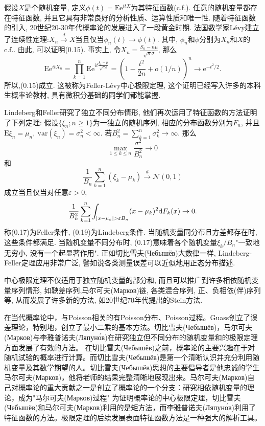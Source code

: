 假设$X$是个随机变量, 定义$\phi(t) = \mathrm{E}\mathrm{e}^{itX}$为其特征函数(c.f.). 任意的随机变量都存在特征函数, 并且它具有非常良好的分析性质、运算性质和唯一性. 随着特征函数的引入, 20世纪20-30年代概率论的发展进入了一段黄金时期. 法国数学家Lévy建立了连续性定理:$X_n\stackrel{d}{\rightarrow}X$当且仅当$\phi_n(t)\to\phi(t)$. 其中, $\phi_n$和$\phi$分别为$X_n$和$X$的c.f.. 由此, 可以证明(0.15). 事实上, 令$X_n = \frac{S_n-n\mu}{\sqrt{n}\sigma}$, 那么
\begin{equation}
        \mathrm{E}\mathrm{e}^{itX_n} =\prod_{k=1}^n\mathrm{E}\mathrm{e}^{it\frac{\xi_k-\mu}{\sqrt{n}\sigma}}
        =\left( 1-\frac{t^2}{2n}+o(1/n) \right)^n
        \to \mathrm{e}^{-t^2/2}.
\end{equation}
所以,(0.15)成立. 这被称为Feller-Lévy中心极限定理, 这个证明已经写入许多的本科生概率论教材, 具有微积分基础的同学们都能掌握.

Lindeberg和Feller研究了独立不同分布情形, 他们再次运用了特征函数的方法证明了下列定理: 假设$\{\xi_n;n\geqslant 1\}$为一独立的随机序列, 相应的分布函数分别为$F_n$, 并且$\mathrm{E}\xi_n = \mu_n,~\mathrm{var}(\xi_n) = \sigma^2_n<\infty$. 若$B_n^2 = \sum_{k=1}^{n}\sigma_k^2\to\infty$. 那么
\begin{equation}
    \max_{1\leqslant k\leqslant n} \frac{\sigma^2}{B_n^2}\to 0
\end{equation}
和\begin{equation}
    \frac{1}{B_n}\sum_{k=1}^n(\xi_k-\mu_k)\stackrel{d}{\rightarrow}\mathcal{N}(0,1)
\end{equation}
成立当且仅当对任意$\varepsilon>0$,
\begin{equation}
    \frac{1}{B_n^2}\sum_{k=1}^n\int_{\lvert x-\mu_k\rvert>\varepsilon B_n}(x-\mu_k)^2\mathrm{d}F_k(x)\to 0.
\end{equation}
称(0.17)为Feller条件, (0.19)为Lindeberg条件.  当随机变量同分布且方差都存在时, 这些条件都满足. 当随机变量不同分布时, (0.17)意味着各个随机变量$\xi_k/B_n$"一致地无穷小, 没有一个起显著作用". 正如切比雪夫(Чебышёв)大数律一样, Lindeberg-Feller定理应用非常广泛, 譬如说各类测量误差可以近似地用正态分布描述.

中心极限定理不仅适用于独立随机变量的部分和, 而且可以推广到许多相依随机变量序列情形, 如鞅差序列,马尔可夫(Марков)链, 各类混合序列, 正、负相依(伴)序列等, 从而发展了许多新的方法, 如20世纪70年代提出的Stein方法.



在当代概率论中，与Poisson相关的有Poisson分布、Poisson过程。Guass创立了误差理论，特别地，创立了最小二乘的基本方法。切比雪夫(Чебышёв)，马尔可夫(Марков)与李雅普诺夫(Ляпуно́в)在研究独立但不同分布的随机变量和的极限定理方面发展了有效的方法。
在切比雪夫(Чебышёв)之前，概率论的主要兴趣在于对随机试验的概率进行计算。而切比雪夫(Чебышёв)是第一个清晰认识并充分利用随机变量及其数学期望的人。切比雪夫(Чебышёв)思想的主要倡导者是他忠诚的学生马尔可夫(Марков)，他将老师的结果完整清晰地展现出来。马尔可夫(Марков)自己对概率论的重大贡献之一是创立了概率论的一个分支：研究相依随机变量的理论，成为"马尔可夫(Марков)过程"
为证明概率论的中心极限定理，切比雪夫(Чебышёв)和马尔可夫(Марков)利用的是矩方法，而李雅普诺夫(Ляпуно́в)利用了特征函数的方法。极限定理的后续发展表面特征函数方法是一种强大的解析工具。

